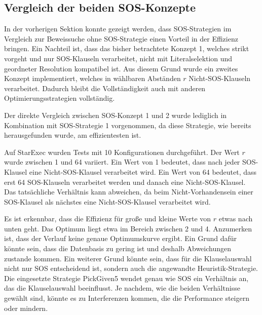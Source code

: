 	
	\subsection{Vergleich der beiden SOS-Konzepte}
	\label{sec:sos2}
	In der vorherigen Sektion konnte gezeigt werden, dass SOS-Strategien im Vergleich zur Beweissuche ohne SOS-Strategie einen Vorteil in der Effizienz bringen. Ein Nachteil ist, dass das bisher betrachtete Konzept 1, welches strikt vorgeht und nur SOS-Klauseln verarbeitet, nicht mit Literalselektion und geordneter Resolution kompatibel ist. Aus diesem Grund wurde ein zweites Konzept implementiert, welches in wählbaren Abständen $r$ Nicht-SOS-Klauseln verarbeitet. Dadurch bleibt die Vollständigkeit auch mit anderen Optimierungsstrategien vollständig.
	
	Der direkte Vergleich zwischen SOS-Konzept 1 und 2 wurde lediglich in Kombination mit SOS-Strategie 1 vorgenommen, da diese Strategie, wie bereits herausgefunden wurde, am effizientesten ist.
	
	Auf StarExec wurden Tests mit 10 Konfigurationen durchgeführt. Der Wert $r$ wurde zwischen 1 und 64 variiert. Ein Wert von 1 bedeutet, dass nach jeder SOS-Klausel eine Nicht-SOS-Klausel verarbeitet wird. Ein Wert von 64 bedeutet, dass erst 64 SOS-Klauseln verarbeitet werden und danach eine Nicht-SOS-Klausel. Das tatsächliche Verhältnis kann abweichen, da beim Nicht-Vorhandensein einer SOS-Klausel als nächstes eine Nicht-SOS-Klausel verarbeitet wird.
	
	Es ist erkennbar, dass die Effizienz für große und kleine Werte von $r$ etwas nach unten geht. Das Optimum liegt etwa im Bereich zwischen 2 und 4. Anzumerken ist, dass der Verlauf keine genaue Optimumskurve ergibt. Ein Grund dafür könnte sein, dass die Datenbasis zu gering ist und deshalb Abweichungen zustande kommen. Ein weiterer Grund könnte sein, dass für die Klauselauswahl nicht nur SOS entscheidend ist, sondern auch die angewandte Heuristik-Strategie. Die eingesetzte Strategie PickGiven5 wendet genau wie SOS ein Verhältnis an, das die Klauselauswahl beeinflusst. Je nachdem, wie die beiden Verhältnisse gewählt sind, könnte es zu Interferenzen kommen, die die Performance steigern oder mindern.
	
